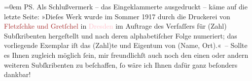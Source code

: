            \leftskip=0em{}\pstart
           PS. Als Schlußvermerk – das Eingeklammerte ausgedruckt – käme auf die letzte
                    Seite:\pend
           \pstart
           »Dieſes Werk wurde im Sommer 1917 durch die Druckerei von \textcolor{brown}{Fletzſchke und Gretſchel}{} in \textcolor{pink}{Dresden}{}\ledrightnote{\textcolor{pink}{Dresden}} im Auftrage des Verfaſſers für (Zahl)
                    Subſkribenten hergeſtellt und nach deren alphabetiſcher Folge numeriert; das
                    vorliegende Exemplar iſt das (Zahl)te und Eigentum von (Name, Ort).« –\pend
           \pstart
           Sollte es Ihnen zugleich möglich ſein, mir freundlichſt auch noch den einen oder
                    andern weiteren Subſkribenten zu beſchaffen, ſo wäre ich Ihnen dafür ganz
                    beſonders dankbar!\pend
           \endnumbering{}  
      
